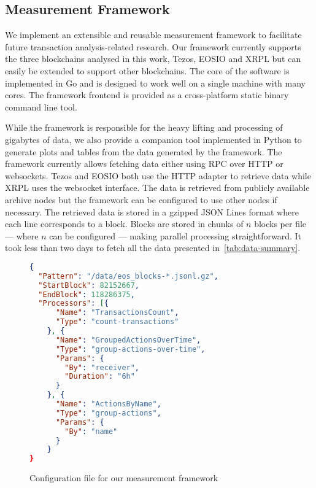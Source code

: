 \subsection{Measurement Framework}
We implement an extensible and reusable measurement framework to facilitate future transaction analysis-related research.
Our framework currently supports the three blockchains analysed in this work, Tezos, EOSIO and XRPL but can easily be extended to support other blockchains.
The core of the software is implemented in Go and is designed to work well on a single machine with many cores.
The framework frontend is provided as a cross-platform static binary command line tool.

While the framework is responsible for the heavy lifting and processing of gigabytes of data, we also provide a companion tool implemented in Python to generate plots and tables from the data generated by the framework.
The framework currently allows fetching data either using RPC over HTTP or websockets.
Tezos and EOSIO both use the HTTP adapter to retrieve data while XRPL uses the websocket interface.
The data is retrieved from publicly available archive nodes but the framework can be configured to use other nodes if necessary.
The retrieved data is stored in a gzipped JSON Lines format where each line corresponds to a block. Blocks are stored in chunks of $n$ blocks per file --- where $n$ can be configured --- making parallel processing straightforward. It took less than two days to fetch all the data presented in~\autoref{tab:data-summary}.

\begin{figure}[h!]
\begin{lstlisting}[language=json]
{
  "Pattern": "/data/eos_blocks-*.jsonl.gz",
  "StartBlock": 82152667,
  "EndBlock": 118286375,
  "Processors": [{
      "Name": "TransactionsCount",
      "Type": "count-transactions"
    }, {
      "Name": "GroupedActionsOverTime",
      "Type": "group-actions-over-time",
      "Params": {
        "By": "receiver",
        "Duration": "6h"
      }
    }, {
      "Name": "ActionsByName",
      "Type": "group-actions",
      "Params": {
        "By": "name"
      }
    }
}
\end{lstlisting}
  \caption{Configuration file for our measurement framework}
  \label{lis:framework-config}
\end{figure}

